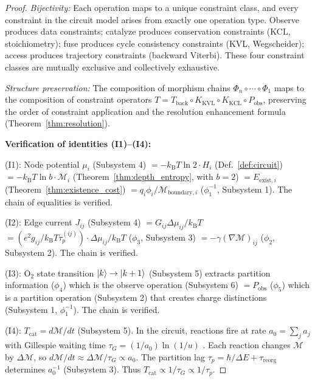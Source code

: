 \documentclass[twocolumn,10pt,a4paper]{article}
\theoremstyle{definition}
\theoremstyle{remark}
\newcommand{\kB}{k_{\mathrm{B}}}
\newcommand{\Depth}{\mathcal{M}}
\newcommand{\taup}{\tau_p}
\newcommand{\morphism}{\Phi}
\begin{document}
\begin{proof}
\emph{Bijectivity:} Each operation maps to a unique constraint class, and every constraint in the circuit model arises from exactly one operation type. Observe produces data constraints; catalyze produces conservation constraints (KCL, stoichiometry); fuse produces cycle consistency constraints (KVL, Wegscheider); access produces trajectory constraints (backward Viterbi). These four constraint classes are mutually exclusive and collectively exhaustive.

\emph{Structure preservation:} The composition of morphism chains $\morphism_n \circ \cdots \circ \morphism_1$ maps to the composition of constraint operators $T = T_{\mathrm{back}} \circ K_{\mathrm{KVL}} \circ K_{\mathrm{KCL}} \circ P_{\mathrm{obs}}$, preserving the order of constraint application and the resolution enhancement formula (Theorem~\ref{thm:resolution}).

\textbf{Verification of identities (I1)--(I4):}

(I1): Node potential $\mu_i$ (Subsystem 4) $= -\kB T \ln 2 \cdot H_i$ (Def.~\ref{def:circuit}) $= -\kB T \ln b \cdot \Depth_i$ (Theorem~\ref{thm:depth_entropy}, with $b=2$) $= E_{\mathrm{exist},i}$ (Theorem~\ref{thm:existence_cost}) $= q_i \phi_i / \Depth_{\mathrm{boundary},i}$ ($\phi_1^{-1}$, Subsystem 1). The chain of equalities is verified.

(I2): Edge current $J_{ij}$ (Subsystem 4) $= G_{ij} \Delta\mu_{ij}/\kB T$ $= (e^2 g_{ij}/\kB T \taup^{(ij)}) \cdot \Delta\mu_{ij}/\kB T$ ($\phi_3$, Subsystem 3) $= -\gamma (\nabla\Depth)_{ij}$ ($\phi_2$, Subsystem 2). The chain is verified.

(I3): O$_2$ state transition $\ket{k} \to \ket{k+1}$ (Subsystem 5) extracts partition information ($\phi_4$) which is the observe operation (Subsystem 6) $= P_{\mathrm{obs}}$ ($\phi_5$) which is a partition operation (Subsystem 2) that creates charge distinctions (Subsystem 1, $\phi_1^{-1}$). The chain is verified.

(I4): $T_{\mathrm{cat}} = d\Depth/dt$ (Subsystem 5). In the circuit, reactions fire at rate $a_0 = \sum_j a_j$ with Gillespie waiting time $\tau_G = (1/a_0)\ln(1/u)$ \citep{Gillespie1977}. Each reaction changes $\Depth$ by $\Delta\Depth$, so $d\Depth/dt \approx \Delta\Depth / \tau_G \propto a_0$. The partition lag $\taup = \hbar/\Delta E + \tau_{\mathrm{reorg}}$ determines $a_0^{-1}$ (Subsystem 3). Thus $T_{\mathrm{cat}} \propto 1/\tau_G \propto 1/\taup$.
\end{proof}
\end{document}
